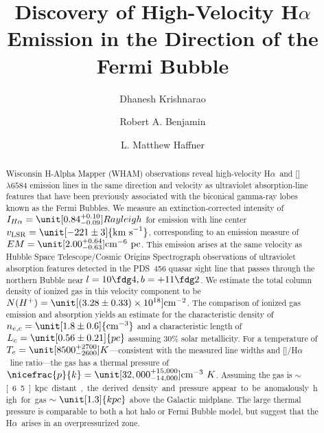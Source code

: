 \documentclass[twocolumn]{aastex63}
\newcommand{\nii}{\ion{N}{2}}
\newcommand{\ha}{H\ensuremath{\alpha}}
\newcommand{\kms}{\mathrm{km~s}\ensuremath{^{-1}}}
\newcommand{\vlsr}{\ensuremath{v_\mathrm{LSR}}}
\begin{document}
\title{Discovery of High-Velocity H$\alpha$ Emission in the Direction of the Fermi Bubble} 



\author[0000-0002-7955-7359]{Dhanesh Krishnarao}

\author[0000-0002-8109-2642]{Robert A. Benjamin}

\author[0000-0002-9947-6396]{L. Matthew Haffner}

\begin{abstract}

Wisconsin H-Alpha Mapper (WHAM) observations reveal high-velocity \ha\ and [\nii]$\lambda6584$ emission lines in the same direction and velocity as ultraviolet absorption-line features that have been previously associated with the biconical gamma-ray lobes known as the Fermi Bubbles. 
We measure an extinction-corrected intensity of $I_{\ha}=\unit[0.84^{+0.10}_{-0.09}]{Rayleigh}$ for emission with line center $\vlsr=\unit[-221\pm3]{\kms}$, corresponding to an emission measure of $EM = \unit[2.00^{+0.64}_{-0.63}]{\textrm{cm}^{-6}~\textrm{pc}}$.
This emission arises at the same velocity as Hubble Space Telescope/Cosmic Origins Spectrograph observations of ultraviolet absorption features detected in the PDS~456 quasar sight line that passes through the northern Bubble near $l = 10\fdg4, b = +11\fdg2$.
We estimate the total column density of ionized gas in this velocity component to be $N(H^{+}) = \unit[\left(3.28 \pm 0.33\right) \times 10^{18}]{\textrm{cm}^{-2}}$.
The comparison of ionized gas emission and absorption yields an estimate for the characteristic density of $n_{e,c} = \unit[1.8 \pm 0.6]{\textrm{cm}^{-3}}$ and a characteristic length of $L_{c} =\unit[0.56 \pm 0.21]{pc}$ assuming $30\%$ solar metallicity.
For a temperature of $T_{e}=\unit[8500^{+2700}_{-2600}]{K}$---consistent with the measured line widths and [\nii]/\ha\ line ratio---the gas has a thermal pressure of $\nicefrac{p}{k} = \unit[32,000^{+15,000}_{-14,000}]{\textrm{cm}^{-3}~K}$.
Assuming the gas is $\sim $ \unit[6.5]{kpc} distant, the derived density and pressure appear to be anomalously high for gas $\sim \unit[1.3]{kpc}$ above the Galactic midplane. The large thermal pressure is comparable to both a hot halo or Fermi Bubble model, but suggest that the \ha\ arises in an overpressurized zone.  



\end{abstract} 
\end{document}
